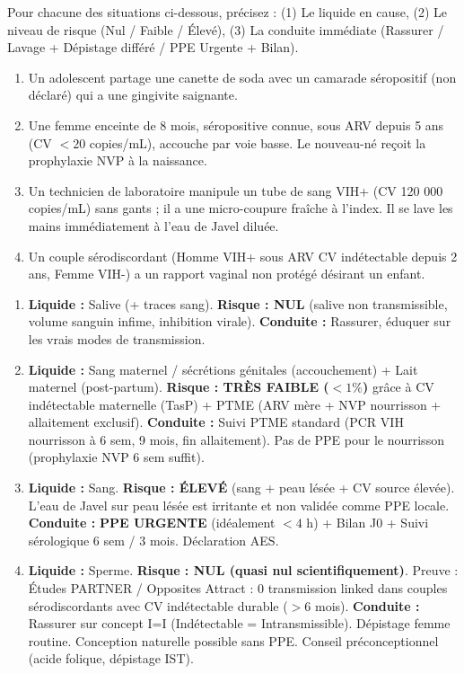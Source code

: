 \documentclass[11pt]{article}
\begin{document}
\begin{exercice}
Pour chacune des situations ci-dessous, précisez : (1) Le liquide en cause, (2) Le niveau de risque (Nul / Faible / Élevé), (3) La conduite immédiate (Rassurer / Lavage + Dépistage différé / PPE Urgente + Bilan).
\begin{enumerate}
    \item Un adolescent partage une canette de soda avec un camarade séropositif (non déclaré) qui a une gingivite saignante.
    \item Une femme enceinte de 8 mois, séropositive connue, sous ARV depuis 5 ans (CV $< 20$ copies/mL), accouche par voie basse. Le nouveau-né reçoit la prophylaxie NVP à la naissance.
    \item Un technicien de laboratoire manipule un tube de sang VIH+ (CV 120 000 copies/mL) sans gants ; il a une micro-coupure fraîche à l'index. Il se lave les mains immédiatement à l'eau de Javel diluée.
    \item Un couple sérodiscordant (Homme VIH+ sous ARV CV indétectable depuis 2 ans, Femme VIH-) a un rapport vaginal non protégé désirant un enfant.
\end{enumerate}
\end{exercice}

\begin{corrige}[Exercice n°1]
\begin{enumerate}
    \item \textbf{Liquide :} Salive (+ traces sang). \textbf{Risque : NUL} (salive non transmissible, volume sanguin infime, inhibition virale). \textbf{Conduite :} Rassurer, éduquer sur les vrais modes de transmission.
    \item \textbf{Liquide :} Sang maternel / sécrétions génitales (accouchement) + Lait maternel (post-partum). \textbf{Risque : TRÈS FAIBLE ($< 1 \%$)} grâce à CV indétectable maternelle (TasP) + PTME (ARV mère + NVP nourrisson + allaitement exclusif). \textbf{Conduite :} Suivi PTME standard (PCR VIH nourrisson à 6 sem, 9 mois, fin allaitement). Pas de PPE pour le nourrisson (prophylaxie NVP 6 sem suffit).
    \item \textbf{Liquide :} Sang. \textbf{Risque : ÉLEVÉ} (sang + peau lésée + CV source élevée). L'eau de Javel sur peau lésée est irritante et non validée comme PPE locale. \textbf{Conduite :} \textbf{PPE URGENTE} (idéalement $< 4$ h) + Bilan J0 + Suivi sérologique 6 sem / 3 mois. Déclaration AES.
    \item \textbf{Liquide :} Sperme. \textbf{Risque : NUL (quasi nul scientifiquement)}. Preuve : Études PARTNER / Opposites Attract : 0 transmission linked dans couples sérodiscordants avec CV indétectable durable ($> 6$ mois). \textbf{Conduite :} Rassurer sur concept I=I (Indétectable = Intransmissible). Dépistage femme routine. Conception naturelle possible sans PPE. Conseil préconceptionnel (acide folique, dépistage IST).
\end{enumerate}
\end{corrige}
\end{document}
